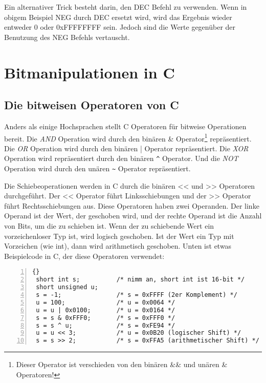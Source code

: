 Ein alternativer Trick besteht darin, den {\code DEC} Befehl zu
verwenden. Wenn in obigem Beispiel {\code NEG} durch {\code DEC}
ersetzt wird, wird das Ergebnis wieder entweder 0 oder 0xFFFFFFFF
sein. Jedoch sind die Werte gegen\"{u}ber der Benutzung des {\code NEG}
Befehls vertauscht.


\section{Bitmanipulationen in C }

\subsection{Die bitweisen Operatoren von C}

Anders als einige Hochsprachen stellt C Operatoren f\"{u}r bitweise
Operationen bereit. Die \emph{AND} Operation wird durch den bin\"{a}ren
{\code \&} Operator\footnote{Dieser Operator ist verschieden von den
bin\"{a}ren {\code \&\&} und un\"{a}ren {\code \&} Operatoren!}
repr\"{a}sentiert. Die \emph{OR} Operation wird durch den bin\"{a}ren {\code
|} Operator repr\"{a}sentiert. Die \emph{XOR} Operation wird
repr\"{a}sentiert durch den bin\"{a}ren {\code \verb|^| } Operator. Und die
\emph{NOT} Operation wird durch den un\"{a}ren {\code \verb|~| }
Operator repr\"{a}sentiert.

Die Schiebeoperationen werden in C durch die bin\"{a}ren {\code <<} und
{\code >>} Operatoren  durchgef\"{u}hrt. Der
{\code <<} Operator f\"{u}hrt Linksschiebungen und der {\code >>}
Operator f\"{u}hrt Rechtsschiebungen aus. Diese Operatoren haben zwei
Operanden. Der linke Operand ist der Wert, der geschoben wird, und
der rechte Operand ist die Anzahl von Bits, um die zu schieben ist.
Wenn der zu schiebende Wert ein vorzeichenloser Typ ist, wird
logisch geschoben. Ist der Wert ein Typ mit Vorzeichen (wie {\code
int}), dann wird arithmetisch geschoben. Unten ist etwas
Beispielcode in C, der diese Operatoren verwendet:
\begin{lstlisting}[frame=tblr, numbers=left]{}
 short int s;          /* nimm an, short int ist 16-bit */
 short unsigned u;
 s = -1;               /* s = 0xFFFF (2er Komplement) */
 u = 100;              /* u = 0x0064 */
 u = u | 0x0100;       /* u = 0x0164 */
 s = s & 0xFFF0;       /* s = 0xFFF0 */
 s = s ^ u;            /* s = 0xFE94 */
 u = u << 3;           /* u = 0x0B20 (logischer Shift) */
 s = s >> 2;           /* s = 0xFFA5 (arithmetischer Shift) */
\end{lstlisting}

